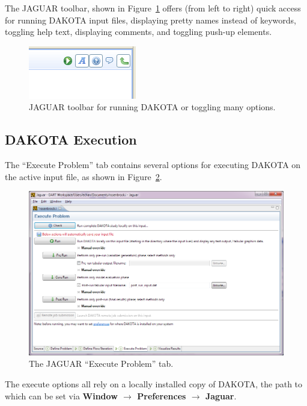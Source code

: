 The JAGUAR toolbar, shown in Figure~\ref{fig:input:jaguar_toolbar}
offers (from left to right) quick access for running DAKOTA input
files, displaying pretty names instead of keywords, toggling help
text, displaying comments, and toggling push-up elements.

\begin{figure}
  \centering
  \includegraphics[scale=0.4]{images/jaguar_toolbar}
  \caption{JAGUAR toolbar for running DAKOTA or toggling many
  options.}
  \label{fig:input:jaguar_toolbar}
\end{figure}


\subsection{DAKOTA Execution}

The ``Execute Problem'' tab contains several options for executing
DAKOTA on the active input file, as shown in
Figure~\ref{fig:input:jag_execute}.
\begin{figure}[htbp]
  \centering
  \includegraphics[scale=0.6]{images/4ExecuteProblem}
  \caption{The JAGUAR ``Execute Problem'' tab.}
  \label{fig:input:jag_execute}
\end{figure}
The execute options all rely on a locally installed copy of DAKOTA,
the path to which can be set via {\bf Window $\rightarrow$ Preferences $\rightarrow$ Jaguar}.

